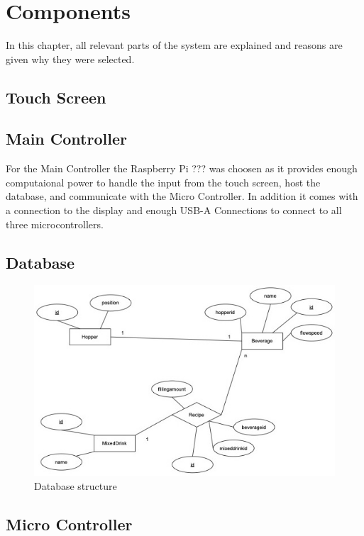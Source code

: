 \chapter{Components}

In this chapter, all relevant parts of the system are explained and reasons are given why they were selected.

\section{Touch Screen}

    

\section{Main Controller}

    For the Main Controller the Raspberry Pi ??? was choosen as it provides enough computaional power to handle the input from the touch screen, host the database, and communicate with the Micro Controller. In addition it comes with a connection to the display and enough USB-A Connections to connect to all three microcontrollers.

\section{Database}



    \begin{figure}[h]
        \centering
        \includegraphics[width=120mm]{content/figures/database.jpg}
        \caption{Database structure \label{fig:database}}
    \end{figure}


\section{Micro Controller}

